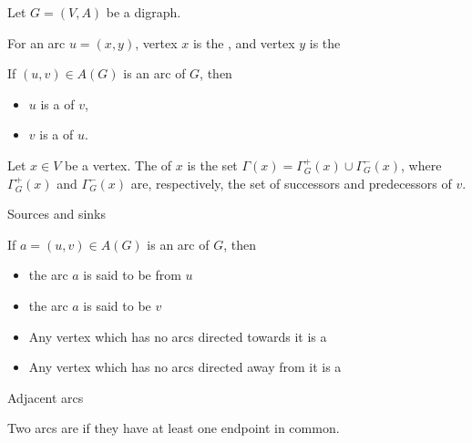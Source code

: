 \documentclass[aspectratio=43]{beamer}
\begin{document}
\begin{frame}
	Let $G=(V,A)$ be a digraph.
	\begin{definition}
	For an arc $u=(x,y)$, vertex $x$ is the , and vertex $y$ is the 
	\end{definition}
	\begin{definition}
		If $(u,v)\in A(G)$ is an arc of $G$, then
		\begin{itemize}
			\item  $u$ is a  of $v$,
			\item  $v$ is a  of $u$.
		\end{itemize}
	\end{definition}
	\begin{definition}
	Let $x\in V$ be a vertex. The  of $x$ is the set $\Gamma(x) = \Gamma^+_G(x)\cup\Gamma^-_G(x)$, where $\Gamma^+_G(x)$ and $\Gamma^-_G(x)$ are, respectively, the set of successors and predecessors of $v$.
	\end{definition}
\end{frame}
	
	
\begin{frame}{Sources and sinks}
	\begin{definition}
		If $a=(u,v)\in A(G)$ is an arc of $G$, then
		\begin{itemize}
			\item the arc $a$ is said to be  from $u$
			\item the arc $a$ is said to be  $v$
		\end{itemize}
	\end{definition}
	\vfill
	\begin{definition}
		\begin{itemize}
			\item Any vertex which has no arcs directed towards it is a 
			\item Any vertex which has no arcs directed away from it is a 
		\end{itemize}
	\end{definition}
\end{frame}

\begin{frame}{Adjacent arcs}
	\begin{definition}
		Two arcs are  if they have at least one endpoint in common.
	\end{definition}
\end{frame}
\end{document}
